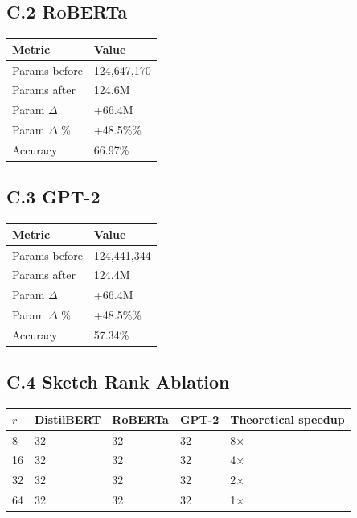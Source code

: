 \subsection{C.2 RoBERTa}

\begin{table}[H]
\centering
\small
\begin{tabular}{ll}
\toprule
\textbf{Metric} & \textbf{Value} \\
\midrule
Params before & 124,647,170 \\
Params after & 124.6M \\
Param $\Delta$ & +66.4M \\
Param $\Delta$ \% & +48.5\%\% \\
Accuracy & 66.97\% \\
\bottomrule
\end{tabular}
\end{table}

\subsection{C.3 GPT-2}

\begin{table}[H]
\centering
\small
\begin{tabular}{ll}
\toprule
\textbf{Metric} & \textbf{Value} \\
\midrule
Params before & 124,441,344 \\
Params after & 124.4M \\
Param $\Delta$ & +66.4M \\
Param $\Delta$ \% & +48.5\%\% \\
Accuracy & 57.34\% \\
\bottomrule
\end{tabular}
\end{table}

\subsection{C.4 Sketch Rank Ablation}

\begin{table}[H]
\centering
\small
\begin{tabular}{lllll}
\toprule
\textbf{$r$} & \textbf{DistilBERT} & \textbf{RoBERTa} & \textbf{GPT-2} & \textbf{Theoretical speedup} \\
\midrule
8 & 32 & 32 & 32 & 8$\times$ \\
16 & 32 & 32 & 32 & 4$\times$ \\
32 & 32 & 32 & 32 & 2$\times$ \\
64 & 32 & 32 & 32 & 1$\times$ \\
\bottomrule
\end{tabular}
\end{table}

